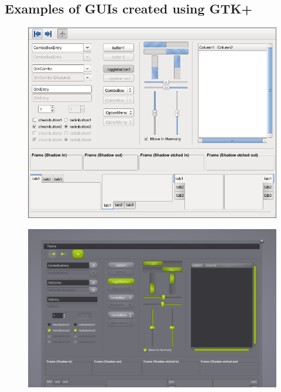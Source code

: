 \documentclass[12pt]{article}
\begin{document}
\subsection{Examples of GUIs created using GTK+}

\begin{figure}[h!]
\centering
\includegraphics[scale=0.4]{gui1}
\end{figure}

\begin{figure}[h!]
\centering
\includegraphics[scale=0.5]{gui2}
\end{figure}

\clearpage
\end{document}
